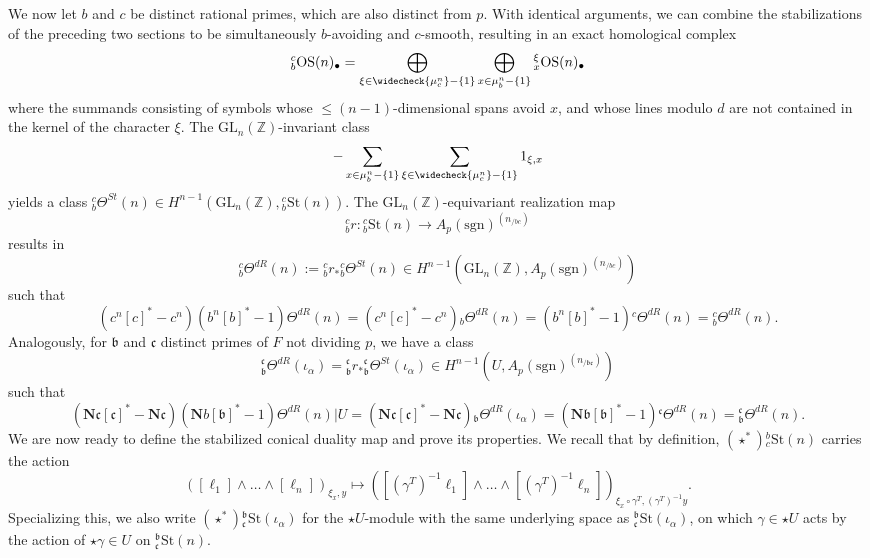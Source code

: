\documentclass[10pt]{amsart}
\theoremstyle{definition}
\newcommand{\Z}{\mathbb{Z}}
\renewcommand{\c}{\mathfrak{c}}
\renewcommand{\b}{\mathfrak{b}}
\newcommand{\sgn}{\mathrm{sgn}}
\newcommand{\St}{\mathrm{St}}
\newcommand{\OS}{\mathrm{OS}}
\newcommand{\GL}{\mathrm{GL}}
\numberwithin{equation}{section}
\begin{document}
    We now let $b$ and $c$ be distinct rational primes, which are also distinct from $p$. With identical arguments, we can combine the stabilizations of the preceding two sections to be simultaneously $b$-avoiding and $c$-smooth, resulting in an exact homological complex 
    \[
    {}_b^c\OS(n)_\bullet = \bigoplus_{\xi \in \widecheck{\mu_c^n}-\{1\}} \bigoplus_{x \in \mu_b^n-\{1\}} {}^\xi_x\OS(n)_\bullet
    \]
    where the summands consisting of symbols whose $\le(n-1)$-dimensional spans avoid $x$, and whose lines modulo $d$ are not contained in the kernel of the character $\xi$. The $\GL_n(\Z)$-invariant class 
    \[
    - \sum_{x\in \mu_b^n-\{1\}}\sum_{\xi\in \widecheck{\mu_c^n}-\{1\}} 1_{\xi, x}
    \]
    yields a class ${}_b^c\Theta^{St}(n)\in H^{n-1}(\GL_n(\Z),{}^c_b\St(n))$. The $\GL_n(\Z)$-equivariant realization map
    \[
    {}^c_br: {}^c_b\St(n)\to A_p(\sgn)^{(n_{/bc})}
    \]
    results in
    \[
    {}_b^c\Theta^{dR}(n) :={}^c_br_* {}_b^c\Theta^{St}(n)\in H^{n-1}(\GL_n(\Z), A_p(\sgn)^{(n_{/bc})})
    \]
    such that 
    \[
    (c^n[c]^*-c^n)(b^n[b]^*-1)\Theta^{dR}(n) = (c^n[c]^*-c^n){}_b\Theta^{dR}(n)= (b^n[b]^*-1) {}^c\Theta^{dR}(n)= {}^c_b\Theta^{dR}(n).
    \]
    Analogously, for $\b$ and $\c$ distinct primes of $F$ not dividing $p$, we have a class 
    \[
        {}_\b^\c\Theta^{dR}(\iota_\alpha)= {}^\c_\b r_*{}_\b^\c\Theta^{St}(\iota_\alpha) \in H^{n-1}(U, A_p(\sgn)^{(n_{/\b\c})})
    \]
    such that 
        \[
        (\mathbf{N}\c[\c]^*-\mathbf{N}\c)(\mathbf{N}b[\b]^*-1)\Theta^{dR}(n)|U = (\mathbf{N}\c[\c]^*-\mathbf{N}\c){}_\b\Theta^{dR}(\iota_\alpha)= (\mathbf{N}\b[\b]^*-1) {}^\c\Theta^{dR}(n)= {}^\c_\b\Theta^{dR}(n).
    \]
    We are now ready to define the stabilized conical duality map and prove its properties. We recall that by definition, $(\star^*){}^b_c\St(n)$ carries the action
    \[
    ([\ell_1]\wedge \ldots \wedge [\ell_n])_{\xi_x, y} \mapsto ([(\gamma^T)^{-1}\ell_1] \wedge \ldots \wedge [(\gamma^T)^{-1} \ell_n])_{\xi_x \circ \gamma^T, (\gamma^T)^{-1} y}.
    \]
    Specializing this, we also write $(\star^*){}^\b_\c\St(\iota_\alpha)$ for the $\star U$-module with the same underlying space as ${}^\b_\c\St(\iota_\alpha)$, on which $\gamma \in \star U$ acts by the action of $\star \gamma \in U$ on ${}^\b_\c\St(n)$.
\end{document}
